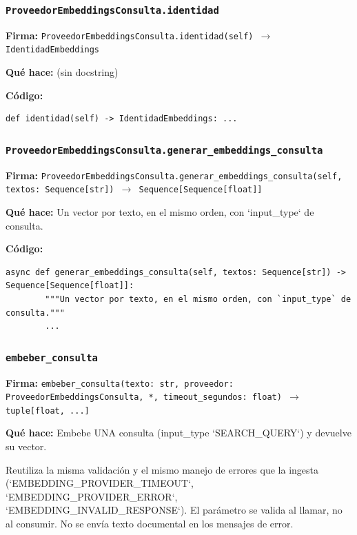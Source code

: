 \documentclass[11pt,a4paper]{article}
\begin{document}
\subsubsection*{\texttt{ProveedorEmbeddingsConsulta.identidad}}
\textbf{Firma:} \texttt{ProveedorEmbeddingsConsulta.identidad(self) $\rightarrow$ IdentidadEmbeddings}

\textbf{Qué hace:} (sin docstring)

\textbf{Código:}
\begin{lstlisting}
def identidad(self) -> IdentidadEmbeddings: ...
\end{lstlisting}

\subsubsection*{\texttt{ProveedorEmbeddingsConsulta.generar\_embeddings\_consulta}}
\textbf{Firma:} \texttt{ProveedorEmbeddingsConsulta.generar\_embeddings\_consulta(self, textos: Sequence[str]) $\rightarrow$ Sequence[Sequence[float]]}

\textbf{Qué hace:} Un vector por texto, en el mismo orden, con `input\_type` de consulta.

\textbf{Código:}
\begin{lstlisting}
async def generar_embeddings_consulta(self, textos: Sequence[str]) -> Sequence[Sequence[float]]:
        """Un vector por texto, en el mismo orden, con `input_type` de consulta."""
        ...
\end{lstlisting}

\subsubsection*{\texttt{embeber\_consulta}}
\textbf{Firma:} \texttt{embeber\_consulta(texto: str, proveedor: ProveedorEmbeddingsConsulta, *, timeout\_segundos: float) $\rightarrow$ tuple[float, ...]}

\textbf{Qué hace:} Embebe UNA consulta (input\_type `SEARCH\_QUERY`) y devuelve su vector.

Reutiliza la misma validación y el mismo manejo de errores que la ingesta
(`EMBEDDING\_PROVIDER\_TIMEOUT`, `EMBEDDING\_PROVIDER\_ERROR`,
`EMBEDDING\_INVALID\_RESPONSE`). El parámetro se valida al llamar, no al
consumir. No se envía texto documental en los mensajes de error.
\end{document}
